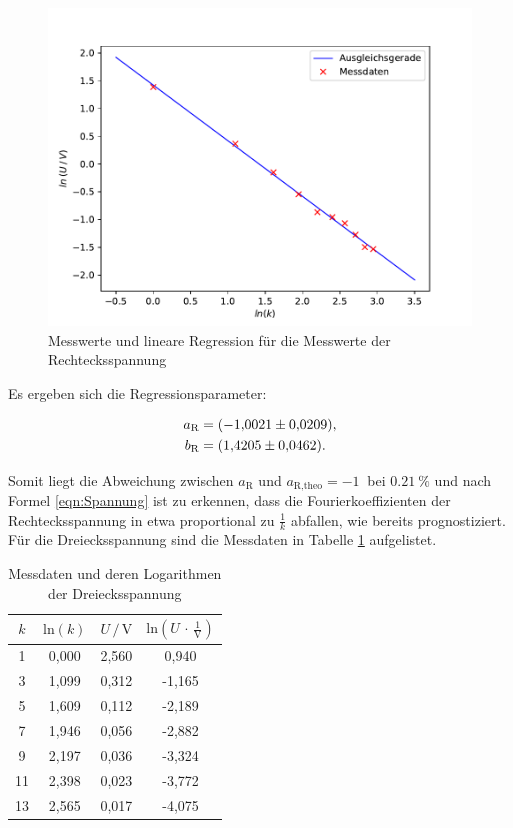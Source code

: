 \begin{figure}[H]
    \centering
    \includegraphics[scale=1.0]{content/plot2.pdf}
    \caption{Messwerte und lineare Regression für die Messwerte der Rechtecksspannung}
    \label{fig:Recht}
\end{figure}

Es ergeben sich die Regressionsparameter:

\begin{align*}
    a_\text{R} &= \SI{-1.0021 \pm 0.0209}{}, \\
    b_\text{R} &= \SI{1.4205 \pm 0.0462}{}.
\end{align*}

Somit liegt die Abweichung zwischen $a_\text{R}$ und $a_\text{R,theo} = \SI{-1}{}$ bei $\SI{0.21}{\percent}$ und
nach Formel \eqref{eqn:Spannung} ist zu erkennen, dass die Fourierkoeffizienten der Rechtecksspannung in etwa
proportional zu $\frac{1}{k}$ abfallen, wie bereits prognostiziert.
\\
\newpage
Für die Dreiecksspannung sind die Messdaten in Tabelle \ref{tab:Messdaten3} aufgelistet.


\begin{table}[H]
    \centering
    \caption{Messdaten und deren Logarithmen der Dreiecksspannung}
    \label{tab:Messdaten3}
    \begin{tabular}{c c c c}
    \toprule
    $k$ & $\text{ln} (k)$ & $U \,/\, \si{\volt}$ & $\text{ln}(U \,\cdot\, \frac{1}{\si{\volt}})$ \\
    \midrule
     1 & 0,000 & 2,560 &  0,940 \\
     3 & 1,099 & 0,312 & -1,165 \\
     5 & 1,609 & 0,112 & -2,189 \\
     7 & 1,946 & 0,056 & -2,882 \\
     9 & 2,197 & 0,036 & -3,324 \\
    11 & 2,398 & 0,023 & -3,772 \\
    13 & 2,565 & 0,017 & -4,075 \\
    \bottomrule
    \end{tabular}
\end{table} 

